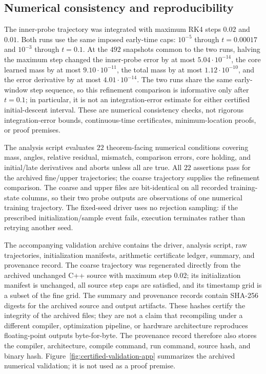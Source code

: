 \documentclass[10pt]{article}
\theoremstyle{remark}\newtheorem{remark}[theorem]{Remark}
\begin{document}
\subsection{Numerical consistency and reproducibility}
The inner-probe trajectory was integrated with maximum RK4 steps $0.02$
and $0.01$. Both runs use the same imposed early-time caps:
$10^{-5}$ through $t=0.00017$ and $10^{-3}$ through $t=0.1$.
At the $492$ snapshots common to the two runs, halving the maximum step
changed the inner-probe error by at most $5.04\cdot10^{-14}$, the core
learned mass by at most $9.10\cdot10^{-11}$, the total mass by at most
$1.12\cdot10^{-10}$, and the error derivative by at most
$4.01\cdot10^{-14}$. The two runs share the same early-window step
sequence, so this refinement comparison is informative only after
$t=0.1$; in particular, it is not an integration-error estimate for
either certified initial-descent interval. These are numerical consistency
checks, not rigorous integration-error bounds, continuous-time certificates,
minimum-location proofs, or proof premises.

The analysis script evaluates $22$ theorem-facing numerical conditions
covering mass, angles, relative residual, mismatch, comparison errors,
core holding, and initial/late derivatives and aborts unless all are true.
All $22$ assertions pass for the archived fine/upper trajectories; the
coarse trajectory supplies the refinement comparison. The coarse and
upper files are bit-identical on all recorded training-state columns, so
their two probe outputs are observations of one numerical training
trajectory. The fixed-seed driver uses no rejection sampling: if the
prescribed initialization/sample event fails, execution terminates rather
than retrying another seed.

The accompanying validation archive contains the driver, analysis script,
raw trajectories, initialization manifests, arithmetic certificate ledger,
summary, and provenance record. The coarse trajectory was regenerated
directly from the archived unchanged C++ source with maximum step $0.02$;
its initialization manifest is unchanged, all source step caps are
satisfied, and its timestamp grid is a subset of the fine grid.
The summary and provenance records contain SHA-256 digests for the archived
source and output artifacts. These hashes certify the integrity of the
archived files; they are not a claim that recompiling under a different
compiler, optimization pipeline, or hardware architecture reproduces
floating-point outputs byte-for-byte. The provenance record therefore also
stores the compiler, architecture, compile command, run command, source
hash, and binary hash. Figure~\ref{fig:certified-validation-app} summarizes
the archived numerical validation; it is not used as a proof premise.
\end{document}
